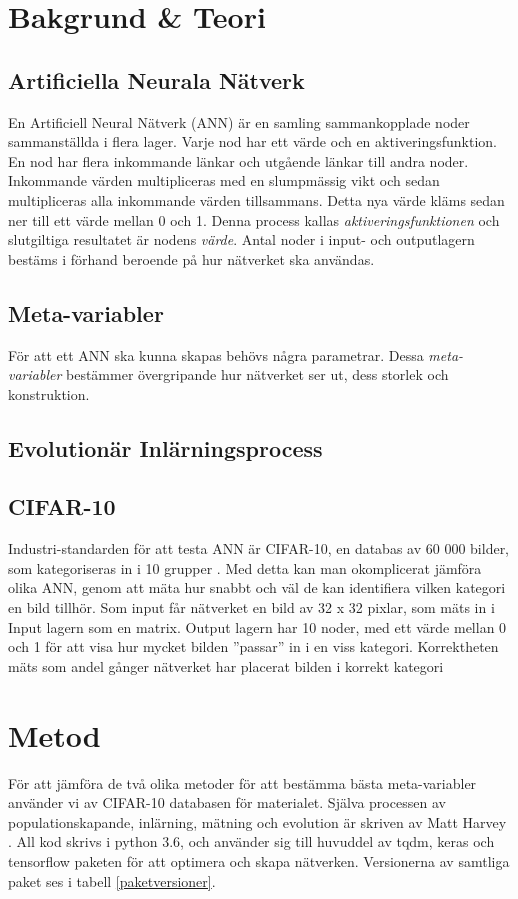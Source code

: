 \documentclass[a4paper, 11pt, twocolumn]{article}
\begin{document}
  \section{Bakgrund \& Teori}
    \subsection{Artificiella Neurala Nätverk}
    En Artificiell Neural Nätverk (ANN) är en samling sammankopplade noder sammanställda i flera lager. Varje nod har ett värde och en aktiveringsfunktion. En nod har flera inkommande länkar och utgående länkar till andra noder. Inkommande värden multipliceras med en slumpmässig vikt och sedan multipliceras alla inkommande värden tillsammans. Detta nya värde kläms sedan ner till ett värde mellan 0 och 1. Denna process kallas \textit{aktiveringsfunktionen} och slutgiltiga resultatet är nodens \textit{värde}. Antal noder i input- och outputlagern bestäms i förhand beroende på hur nätverket ska användas.

    \subsection{Meta-variabler}
    För att ett ANN ska kunna skapas behövs några parametrar. Dessa \textit{meta-variabler} bestämmer övergripande hur nätverket ser ut, dess storlek och konstruktion.

    \subsection{Evolutionär Inlärningsprocess}

    \subsection{CIFAR-10}
    Industri-standarden för att testa ANN är CIFAR-10, en databas av 60 000 bilder, som kategoriseras in i 10 grupper \parencite{krizhevsky2014cifar}. Med detta kan man okomplicerat jämföra olika ANN, genom att mäta hur snabbt och väl de kan identifiera vilken kategori en bild tillhör. Som input får nätverket en bild av 32 x 32 pixlar, som mäts in i Input lagern som en matrix. Output lagern har 10 noder, med ett värde mellan 0 och 1 för att visa hur mycket bilden ”passar” in i en viss kategori. Korrektheten mäts som andel gånger nätverket har placerat bilden i korrekt kategori

  \section{Metod}
  För att jämföra de två olika metoder för att bestämma bästa meta-variabler använder vi av CIFAR-10 databasen för materialet. Själva processen av populationskapande, inlärning, mätning och evolution är skriven av Matt Harvey \parencite{harvey2017}. All kod skrivs i python 3.6, och använder sig till huvuddel av tqdm, keras och tensorflow paketen för att optimera och skapa nätverken. Versionerna av samtliga paket ses i tabell \ref{paketversioner}.
\end{document}
